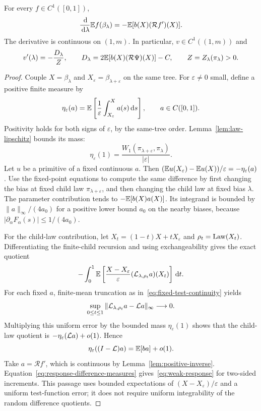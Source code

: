 \begin{lemma}\label{lem:full-response}
For every $f\in C^1([0,1])$,
\begin{equation}\label{eq:weak-response}
 \frac{\,\mathrm d}{\,\mathrm d\lambda}\mathbb E f(\beta_\lambda)
 =-\mathbb E[b(X)(\mathcal R f')(X)].
\end{equation}
The derivative is continuous on $(1,m)$. In particular, $v\in C^1((1,m))$ and
\begin{equation}\label{eq:full-sign}
 v'(\lambda)=-\frac{D_\lambda}{Z},\qquad
 D_\lambda=2\mathbb E[b(X)(\mathcal R\Psi)(X)]-C,
 \qquad Z=Z_\lambda(\pi_\lambda)>0.
\end{equation}
\end{lemma}
\begin{proof}
Couple $X=\beta_\lambda$ and $X_\varepsilon=\beta_{\lambda+\varepsilon}$ on the same tree. For $\varepsilon\ne0$ small, define a positive finite measure by
\[
 \eta_\varepsilon(a)=\mathbb E\left[\frac1\varepsilon
 \int_{X_\varepsilon}^{X}a(s)\,\mathrm d s\right],
 \qquad a\in C([0,1]).
\]
Positivity holds for both signs of $\varepsilon$, by the same-tree order. Lemma~\ref{lem:law-lipschitz} bounds its mass:
\[
 \eta_\varepsilon(1)=
 \frac{W_1(\pi_{\lambda+\varepsilon},\pi_\lambda)}{|\varepsilon|}.
\]
Let $u$ be a primitive of a fixed continuous $a$. Then
$(\mathbb E u(X_\varepsilon)-\mathbb E u(X))/\varepsilon=-\eta_\varepsilon(a)$.
Use the fixed-point equations to compute the same difference by first changing the bias at fixed child law $\pi_{\lambda+\varepsilon}$, and then changing the child law at fixed bias $\lambda$. The parameter contribution tends to $-\mathbb E[b(X)a(X)]$. Its integrand is bounded by $\|a\|_\infty/(4a_0)$ for a positive lower bound $a_0$ on the nearby biases, because $|\partial_\alpha F_\alpha(s)|\le1/(4a_0)$.

For the child-law contribution, let $X_t=(1-t)X+tX_\varepsilon$ and $\rho_t=\operatorname{Law}(X_t)$. Differentiating the finite-child recursion and using exchangeability gives the exact quotient
\[
 -\int_0^1\mathbb E\left[
 \frac{X-X_\varepsilon}{\varepsilon}
 (\mathcal L_{\lambda,\rho_t}a)(X_t)\right]\,\mathrm d t.
\]
For each fixed $a$, finite-mean truncation as in~\eqref{eq:fixed-test-continuity} yields
\[
 \sup_{0\le t\le1}
 \|\mathcal L_{\lambda,\rho_t}a-\mathcal L a\|_\infty\longrightarrow0.
\]
Multiplying this uniform error by the bounded mass $\eta_\varepsilon(1)$ shows that the child-law quotient is $-\eta_\varepsilon(\mathcal L a)+o(1)$. Hence
\begin{equation}\label{eq:response-difference-measures}
 \eta_\varepsilon((I-\mathcal L)a)=\mathbb E[ba]+o(1).
\end{equation}
Take $a=\mathcal R f'$, which is continuous by Lemma~\ref{lem:positive-inverse}. Equation~\eqref{eq:response-difference-measures} gives~\eqref{eq:weak-response} for two-sided increments. This passage uses bounded expectations of $(X-X_\varepsilon)/\varepsilon$ and a uniform test-function error; it does not require uniform integrability of the random difference quotients.


\end{proof}
